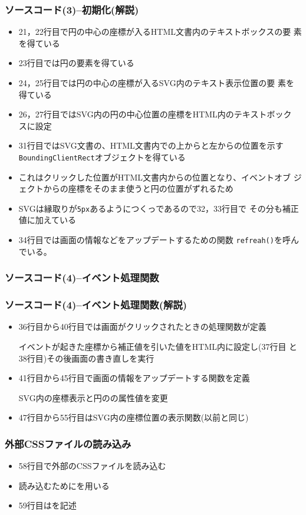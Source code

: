 \begin{frame}[containsverbatim]
 \frametitle{ソースコード(3)--初期化(解説)}
 \begin{itemize}
	\item 21，22行目で円の中心の座標が入るHTML文書内のテキストボックスの要
				素を得ている
	\item 23行目では円の要素を得ている
	\item 24，25行目では円の中心の座標が入るSVG内のテキスト表示位置の要
				素を得ている
	\item 26，27行目ではSVG内の円の中心位置の座標をHTML内のテキストボック
				スに設定
	\item 31行目ではSVG文書の、HTML文書内での上からと左からの位置を示す
				\texttt{BoundingClientRect}オブジェクトを得ている
	\item これはクリックした位置がHTML文書内からの位置となり、イベントオブ
				ジェクトからの座標をそのまま使うと円の位置がずれるため
	\item SVGは縁取りが\texttt{5px}あるようにつくっであるので32，33行目で
				その分も補正値に加えている
	\item 34行目では画面の情報などをアップデートするための関数
				\texttt{refreah()}を呼んでいる。
 \end{itemize}
\end{frame}
\begin{frame}[containsverbatim]
 \frametitle{ソースコード(4)--イベント処理関数}
\end{frame}
\begin{frame}[containsverbatim]
 \frametitle{ソースコード(4)--イベント処理関数(解説)}
\begin{itemize}
	\item 36行目から40行目では画面がクリックされたときの処理関数が定義

				イベントが起きた座標から補正値を引いた値をHTML内に設定し(37行目
				と38行目)その後画面の書き直しを実行
	\item 41行目から45行目で画面の情報をアップデートする関数を定義

				SVG内の座標表示と円のの属性値を変更
	\item 47行目から55行目はSVG内の座標位置の表示関数(以前と同じ)
 \end{itemize}
\end{frame}
 \begin{frame}[containsverbatim]
  \frametitle{外部CSSファイルの読み込み}
  \begin{itemize}
   \item 58行目で外部のCSSファイルを読み込む
   \item 読み込むためにを用いる
   \item 59行目はを記述
  \end{itemize}
 \end{frame}
